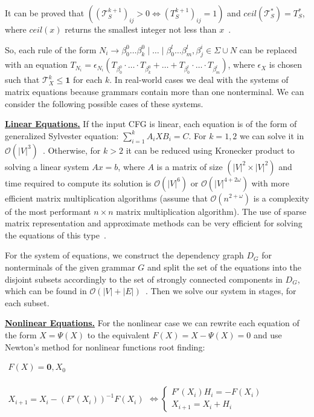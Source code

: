 \documentclass[sigconf]{acmart}
\begin{document}
It can be proved that $((\mathcal{T}_S^{k+1})_{ij} > 0 \iff (T_S^{k+1})_{ij} = 1)$ and $ceil(\mathcal{T}_S^*) = T_S^*$, where $ceil(x)$ returns the smallest integer not less than $x$~\cite{sato2017linear}.

So, each rule of the form $N_i \to \beta^0_0 \dots \beta^0_k \mid \ldots \mid \beta^l_0 \dots \beta^l_m, \beta^i_j \in \Sigma \cup N$ can be replaced with an equation 
$T_{N_i} = \epsilon_{N_i}(T_{\beta^0_0}\cdot \ldots \cdot T_{\beta^0_k} + \ldots + T_{\beta^l_0}\cdot \ldots \cdot T_{\beta^l_m}) $, where $\epsilon_X$ is chosen such that $\mathcal{T}_X^{k} \leq \textbf{1}$ for each $k$.
In real-world cases we deal with the systems of matrix equations because grammars contain more than one nonterminal. 
We can consider the following possible cases of these systems.

\underline{\textbf{Linear Equations.}}
If the input CFG is linear, each equation is of the form of generalized Sylvester equation: $\sum_{i = 1}^{k} A_iXB_i = C$.
For $k = 1, 2$ we can solve it in $\mathcal{O}(|V|^3)$~\cite{Bartels:1972:SME:361573.361582}.
Otherwise, for $k > 2$ it can be reduced using Kronecker product to solving a linear system $Ax = b$, where $A$ is a matrix of size $(|V|^2 \times |V|^2)$ and time required to compute its solution is $\mathcal{O}(|V|^6)$ or $\mathcal{O}(|V|^{4 + 2\omega})$ with more efficient matrix multiplication algorithms (assume that $\mathcal{O}(n^{2+\omega})$ is a complexity of the most performant $n\times n$ matrix multiplication algorithm). 
The use of sparse matrix representation and approximate methods can be very efficient for solving the equations of this type~\cite{bouhamidi2008}.

For the system of equations, we construct the dependency graph $D_G$ for nonterminals of the given grammar $G$ and split the set of the equations into the disjoint subsets accordingly to the set of strongly connected components in $D_G$, which can be found in $\mathcal{O}(|V| + |E|)$~\cite{tarjan1972}.
Then we solve our system in stages, for each subset.

\underline{\textbf{Nonlinear Equations.}}
For the nonlinear case we can rewrite each equation of the form $X = \Psi(X)$ to the equivalent $F(X) = X - \Psi(X) = 0$ and use Newton's method for nonlinear functions root finding:

\begin{center}
\(
\left.
\begin{array}{c}
F(X) = \mathbf{0}, X_0 \\
\end{array} 
\right.
\)

\(
\left. 
\begin{array}{l}
X_{i+1} = X_i - (F'(X_i))^{-1}F(X_i) 
\end{array} 
\right.
\iff 
\left\{
\begin{array}{l}
F'(X_i)H_i = - F(X_i) \\
X_{i+1} = X_i + H_i
\end{array} 
\right.
\)
\end{center}
\end{document}
